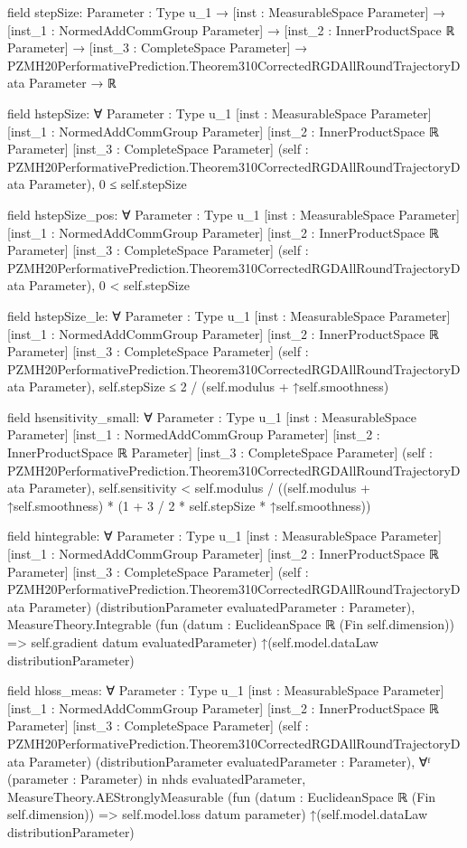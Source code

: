 \documentclass[10pt]{article}
\begin{document}
\begin{ReviewVerbatim}
field stepSize:
{Parameter : Type u_1} →
  [inst : MeasurableSpace Parameter] →
    [inst_1 : NormedAddCommGroup Parameter] →
      [inst_2 : InnerProductSpace ℝ Parameter] →
        [inst_3 : CompleteSpace Parameter] →
          PZMH20PerformativePrediction.Theorem310CorrectedRGDAllRoundTrajectoryData Parameter → ℝ

field hstepSize:
∀ {Parameter : Type u_1} [inst : MeasurableSpace Parameter] [inst_1 : NormedAddCommGroup Parameter]
  [inst_2 : InnerProductSpace ℝ Parameter] [inst_3 : CompleteSpace Parameter]
  (self : PZMH20PerformativePrediction.Theorem310CorrectedRGDAllRoundTrajectoryData Parameter), 0 ≤ self.stepSize

field hstepSize_pos:
∀ {Parameter : Type u_1} [inst : MeasurableSpace Parameter] [inst_1 : NormedAddCommGroup Parameter]
  [inst_2 : InnerProductSpace ℝ Parameter] [inst_3 : CompleteSpace Parameter]
  (self : PZMH20PerformativePrediction.Theorem310CorrectedRGDAllRoundTrajectoryData Parameter), 0 < self.stepSize

field hstepSize_le:
∀ {Parameter : Type u_1} [inst : MeasurableSpace Parameter] [inst_1 : NormedAddCommGroup Parameter]
  [inst_2 : InnerProductSpace ℝ Parameter] [inst_3 : CompleteSpace Parameter]
  (self : PZMH20PerformativePrediction.Theorem310CorrectedRGDAllRoundTrajectoryData Parameter),
  self.stepSize ≤ 2 / (self.modulus + ↑self.smoothness)

field hsensitivity_small:
∀ {Parameter : Type u_1} [inst : MeasurableSpace Parameter] [inst_1 : NormedAddCommGroup Parameter]
  [inst_2 : InnerProductSpace ℝ Parameter] [inst_3 : CompleteSpace Parameter]
  (self : PZMH20PerformativePrediction.Theorem310CorrectedRGDAllRoundTrajectoryData Parameter),
  self.sensitivity < self.modulus / ((self.modulus + ↑self.smoothness) * (1 + 3 / 2 * self.stepSize * ↑self.smoothness))

field hintegrable:
∀ {Parameter : Type u_1} [inst : MeasurableSpace Parameter] [inst_1 : NormedAddCommGroup Parameter]
  [inst_2 : InnerProductSpace ℝ Parameter] [inst_3 : CompleteSpace Parameter]
  (self : PZMH20PerformativePrediction.Theorem310CorrectedRGDAllRoundTrajectoryData Parameter)
  (distributionParameter evaluatedParameter : Parameter),
  MeasureTheory.Integrable
    (fun (datum : EuclideanSpace ℝ (Fin self.dimension)) => self.gradient datum evaluatedParameter)
    ↑(self.model.dataLaw distributionParameter)

field hloss_meas:
∀ {Parameter : Type u_1} [inst : MeasurableSpace Parameter] [inst_1 : NormedAddCommGroup Parameter]
  [inst_2 : InnerProductSpace ℝ Parameter] [inst_3 : CompleteSpace Parameter]
  (self : PZMH20PerformativePrediction.Theorem310CorrectedRGDAllRoundTrajectoryData Parameter)
  (distributionParameter evaluatedParameter : Parameter),
  ∀ᶠ (parameter : Parameter) in nhds evaluatedParameter,
    MeasureTheory.AEStronglyMeasurable
      (fun (datum : EuclideanSpace ℝ (Fin self.dimension)) => self.model.loss datum parameter)
      ↑(self.model.dataLaw distributionParameter)


\end{ReviewVerbatim}
\end{document}
